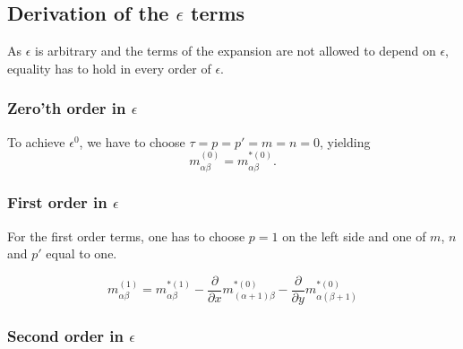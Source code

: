 \documentclass{article}
\begin{document}
\subsection{Derivation of the \texorpdfstring{$\epsilon$}{epsilon} terms}
\label{sub:Derivation of the epsilon terms}
As $\epsilon$ is arbitrary and the terms of the expansion are not allowed to depend on $\epsilon$, equality has to hold in every order of $\epsilon$.

\subsubsection{Zero'th order in \texorpdfstring{$\epsilon$}{epsilon}}
\label{subs:Zero'th order in epsilon}

To achieve $\epsilon^0$, we have to choose $\tau=p=p'=m=n=0$, yielding
\begin{equation}
  \label{eq:zeroth order in epsilon}
  m_{\alpha\beta}^{(0)} = m_{\alpha\beta}^{*(0)}.
\end{equation}


\subsubsection{First order in \texorpdfstring{$\epsilon$}{epsilon}}
\label{subs:First order in epsilon}

For the first order terms, one has to choose $p=1$ on the left side and one of $m$, $n$ and $p'$ equal to one.

\begin{equation}
  \label{eq:first order in epsilon}
  m_{\alpha\beta}^{(1)}
  = m_{\alpha\beta}^{*(1)}
  - \frac{\partial}{\partial x} m_{(\alpha+1)\beta}^{*(0)}
  - \frac{\partial}{\partial y} m_{\alpha(\beta+1)}^{*(0)}
\end{equation}


\subsubsection{Second order in \texorpdfstring{$\epsilon$}{epsilon}}
\label{subs:Second order in epsilon}
\end{document}
